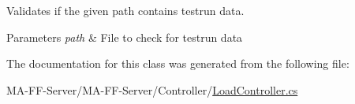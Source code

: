 Validates if the given path contains testrun data. 


\begin{DoxyParams}{Parameters}
{\em path} & File to check for testrun data\\
\hline
\end{DoxyParams}


The documentation for this class was generated from the following file\+:\begin{DoxyCompactItemize}
\item 
M\+A-\/\+F\+F-\/\+Server/\+M\+A-\/\+F\+F-\/\+Server/\+Controller/\hyperlink{_load_controller_8cs}{Load\+Controller.\+cs}\end{DoxyCompactItemize}
